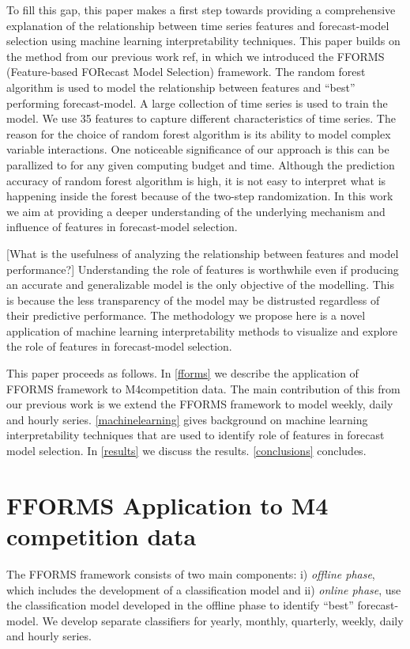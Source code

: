 \documentclass[11pt,a4paper,]{article}
\theoremstyle{definition}
\theoremstyle{definition}
\theoremstyle{definition}
\theoremstyle{remark}
\begin{document}
To fill this gap, this paper makes a first step towards providing a
comprehensive explanation of the relationship between time series
features and forecast-model selection using machine learning
interpretability techniques. This paper builds on the method from our
previous work ref, in which we introduced the FFORMS (Feature-based
FORecast Model Selection) framework. The random forest algorithm is used
to model the relationship between features and ``best'' performing
forecast-model. A large collection of time series is used to train the
model. We use 35 features to capture different characteristics of time
series. The reason for the choice of random forest algorithm is its
ability to model complex variable interactions. One noticeable
significance of our approach is this can be parallized to for any given
computing budget and time. Although the prediction accuracy of random
forest algorithm is high, it is not easy to interpret what is happening
inside the forest because of the two-step randomization. In this work we
aim at providing a deeper understanding of the underlying mechanism and
influence of features in forecast-model selection.

{[}What is the usefulness of analyzing the relationship between features
and model performance?{]} Understanding the role of features is
worthwhile even if producing an accurate and generalizable model is the
only objective of the modelling. This is because the less transparency
of the model may be distrusted regardless of their predictive
performance. The methodology we propose here is a novel application of
machine learning interpretability methods to visualize and explore the
role of features in forecast-model selection.

This paper proceeds as follows. In \autoref{fforms} we describe the
application of FFORMS framework to M4competition data. The main
contribution of this from our previous work \textcite{fforms} is we
extend the FFORMS framework to model weekly, daily and hourly series.
\autoref{machinelearning} gives background on machine learning
interpretability techniques that are used to identify role of features
in forecast model selection. In \autoref{results} we discuss the
results. \autoref{conclusions} concludes.

\section{FFORMS Application to M4 competition data}\label{fforms}

The FFORMS framework consists of two main components: i) \emph{offline
phase}, which includes the development of a classification model and ii)
\emph{online phase}, use the classification model developed in the
offline phase to identify ``best'' forecast-model. We develop separate
classifiers for yearly, monthly, quarterly, weekly, daily and hourly
series.
\end{document}
